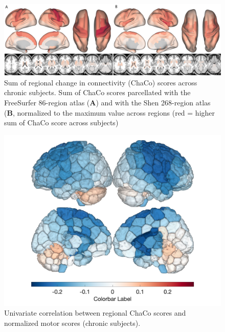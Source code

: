 \documentclass[10pt]{article}
\begin{document}
\begin{figure}[ht]
\centering
\includegraphics[width=1\linewidth]{figures/sum_chaco_fs86shen_surfaces.png}
\caption{Sum of regional change in connectivity (ChaCo) scores across chronic subjects. Sum of ChaCo scores parcellated with the FreeSurfer 86-region atlas (\textbf{A}) and with the Shen 268-region atlas (\textbf{B}, normalized to the maximum value across regions (red = higher sum of ChaCo score across subjects)}
\label{sumchaco_acutechronic}
\end{figure}


\begin{figure}[ht]
\centering
\includegraphics[width=1\linewidth]{figures/correlation_chaco_outcome.png}
\caption{Univariate correlation between regional ChaCo scores and normalized motor scores (chronic subjects).}
\label{corr_chaco_outcome}
\end{figure}
\end{document}
